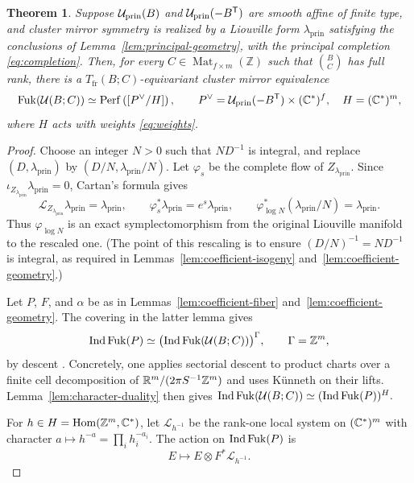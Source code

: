 \documentclass[12pt, letter]{amsart}
\newtheorem{theorem}{Theorem}[section]
\theoremstyle{definition}
\newcommand{\Z}{\mathbb Z}
\newcommand{\pr}{\mathrm{prin}}
\newcommand{\fr}{\mathrm{fr}}
\DeclareMathOperator{\Ind}{Ind}
\numberwithin{equation}{section}
\begin{document}
\begin{theorem}\label{thm:coefficients}
Suppose $\cU_{\pr}(B)$ and $\cU_{\pr}(-B^{\mathsf T})$ are
smooth affine of finite type, and  cluster mirror
symmetry is realized by a Liouville form $\lambda_{\pr}$ satisfying
the conclusions of Lemma~\ref{lem:principal-geometry}, with the
principal completion \eqref{eq:completion}.
Then, for every $C\in\operatorname{Mat}_{f\times m}(\Z)$ such that
$\binom BC$ has full rank, there is a
$T_{\fr}(B;C)$-equivariant cluster mirror equivalence
\[
 \Fuk(\cU(B;C))\simeq
 \Perf\left([P^\vee/H]\right),\qquad
 P^\vee=\cU_{\pr}(-B^{\mathsf T})\times(\C^*)^f,
 \quad H=(\C^*)^m,
\]
where $H$ acts with weights \eqref{eq:weights}.
\end{theorem}
\begin{proof}
Choose an integer $N>0$ such that $ND^{-1}$ is integral,
and replace $(D,\lambda_{\pr})$ by $(D/N,\lambda_{\pr}/N)$.
Let $\varphi_s$ be the complete flow of $Z_{\lambda_{\pr}}$.
Since $\iota_{Z_{\lambda_{\pr}}}\lambda_{\pr}=0$, Cartan's formula gives
\[
 \mathcal L_{Z_{\lambda_{\pr}}}\lambda_{\pr}=\lambda_{\pr},
 \qquad \varphi_s^*\lambda_{\pr}=e^s\lambda_{\pr},
 \qquad \varphi_{\log N}^*(\lambda_{\pr}/N)=\lambda_{\pr}.
\]
Thus $\varphi_{\log N}$ is an exact symplectomorphism from the original
Liouville manifold to the rescaled one.  (The point of this rescaling is to ensure $(D/N)^{-1}=ND^{-1}$ is integral, as required in
Lemmas~\ref{lem:coefficient-isogeny} and~\ref{lem:coefficient-geometry}.) 


Let $P$, $F$, and $\alpha$ be as in
Lemmas~\ref{lem:coefficient-fiber} and~\ref{lem:coefficient-geometry}.
The covering in the latter lemma gives
\[
 \Ind\Fuk(P)\simeq
 \bigl(\Ind\Fuk(\cU(B;C))\bigr)^\Gamma,
 \qquad \Gamma=\Z^m,
\]
by descent \cite[Section~5.5]{HS}.
Concretely, one applies sectorial descent to product charts
over a finite cell decomposition of $\R^m/(2\pi S^{-1}\Z^m)$
and uses K\"unneth on their lifts.
Lemma~\ref{lem:character-duality} then gives
$
 \Ind\Fuk(\cU(B;C))\simeq(\Ind\Fuk(P))^H.
$

For $h\in H=\Hom(\Z^m,\C^*)$, let $\mathcal L_{h^{-1}}$ be
the rank-one local system on $(\mathbb C^*)^m$ with character
$a\mapsto h^{-a}=\prod_i h_i^{-a_i}$. The action on
$\Ind\Fuk(P)$ is
\[
 E\longmapsto E\otimes F^*\mathcal L_{h^{-1}}.
\]


\end{proof}
\end{document}
